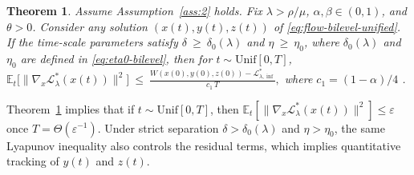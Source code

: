 \documentclass{article}
\newtheorem{theorem}{Theorem}[section]
\newcommand{\1}{\mathbf{1}}
\begin{document}
\begin{theorem}\label{thm:fixed-lambda-simple}
Assume Assumption~\ref{ass:2} holds. Fix $\lambda>\rho/\mu$, $\alpha,\beta\in(0,1)$, and $\theta>0$.
Consider any solution $(x(t),y(t),z(t))$ of \eqref{eq:flow-bilevel-unified}.
If the time-scale parameters satisfy $\delta \ \ge\ \delta_0(\lambda)$ and $\eta \ \ge\ \eta_0$, where $\delta_0(\lambda)$ and $\eta_0$ are defined in \eqref{eq:eta0-bilevel},
then for $t\sim\mathrm{Unif}[0,T]$,
$
\mathbb E_t\Big[\bigl\|\nabla_x \mathcal L_\lambda^{*}(x(t))\bigr\|^{2}\Big]
\ \le\ \frac{W(x(0),y(0),z(0))-\mathcal L_{\lambda,\inf}^{*}}{c_1\,T},
$
where $c_1= (1-\alpha)/4$ .
\end{theorem}
Theorem~\ref{thm:fixed-lambda-simple} implies that if $t\sim\mathrm{Unif}[0,T]$, then
$\mathbb E_t\!\left[\|\nabla_x \mathcal L_\lambda^*(x(t))\|^2\right]\le \varepsilon$
once $T=\Theta(\varepsilon^{-1})$. 
Under strict separation $\delta>\delta_0(\lambda)$ and $\eta>\eta_0$, the same Lyapunov inequality also controls the residual terms, which implies quantitative tracking of $y(t)$ and $z(t)$.
\end{document}
